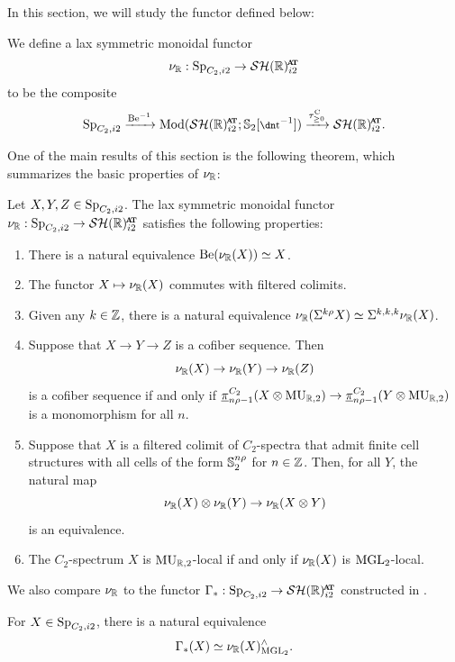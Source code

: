 In this section, we will study the functor defined below:

\begin{dfn}
  We define a lax symmetric monoidal functor
  \[\nur : \Sp_{C_2, i2} \to \SHRat \]
  to be the composite
  \[\Sp_{C_2, i2} \xrightarrow{\b^{-1}} \Mod(\SHRat; \Ss_2[\ta^{-1}]) \xrightarrow{\tau_{\geq 0} ^{\cn}} \SHRat.\]
\end{dfn}

One of the main results of this section is the following theorem, which summarizes the basic properties of $\nu_{\mathbb{R}}$:

\begin{thm} \label{thm:nu-properties}
  Let $X, Y, Z \in \operatorname{\mathrm{Sp}}_{C_2, i2}$. The lax symmetric monoidal functor $\nur : \Sp_{C_2, i2} \to \SHRat$ satisfies the following properties:
  \begin{enumerate}
    \item There is a natural equivalence $\mathrm{Be}(\nu_{\mathbb{R}}(X)) \simeq X$.
    \item The functor $X \mapsto \nu_{\mathbb{R}}(X)$ commutes with filtered colimits.
    \item Given any $k \in \mathbb{Z}$, there is a natural equivalence $\nu_{\mathbb{R}}(\Sigma^{k\rho} X) \simeq \Sigma^{k,k,k} \nu_{\mathbb{R}}(X)$.
    \item Suppose that $X \to Y \to Z$ is a cofiber sequence. Then
      \[\nu_{\mathbb{R}} (X) \to \nu_{\mathbb{R}} (Y) \to \nu_{\mathbb{R}} (Z)\]
      is a cofiber sequence if and only if $\underline{\pi}_{n\rho-1} ^{C_2} (X \otimes \operatorname{\mathrm{MU}}_{\mathbb{R}, 2}) \to \underline{\pi}_{n\rho-1} ^{C_2} (Y \otimes \operatorname{\mathrm{MU}}_{\mathbb{R}, 2})$ is a monomorphism for all $n$.
    \item Suppose that $X$ is a filtered colimit of $C_2$-spectra that admit finite cell structures with all cells of the form $\operatorname{\mathbb{S}}_2^{n\rho}$ for $n \in \mathbb{Z}$. Then, for all $Y$, the natural map
      \[\nu_{\mathbb{R}} (X) \otimes \nu_{\mathbb{R}}(Y) \to \nu_{\mathbb{R}}(X \otimes Y)\]
      is an equivalence.
    \item The $C_2$-spectrum $X$ is $\operatorname{\mathrm{MU}}_{\mathbb{R}, 2}$-local if and only if $\nu_{\mathbb{R}} (X)$ is $\mathrm{MGL}_2$-local. 
  \end{enumerate}
\end{thm}

We also compare $\nu_{\mathbb{R}}$ to the functor $\Gamma_* : \Sp_{C_2, i2} \to \SHRat$ constructed in .

\begin{thm} \label{thm:Gamma-nu-comp}
  For $X \in \operatorname{\mathrm{Sp}}_{C_2, i2}$, there is a natural equivalence
  \[\Gamma_* (X) \simeq \nu_{\mathbb{R}} (X) ^{\wedge} _{\mathrm{MGL}_2}.\]
\end{thm}

